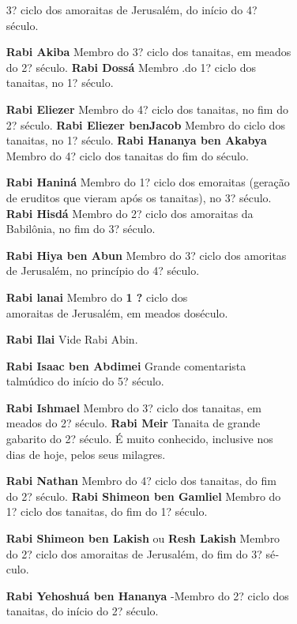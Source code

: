 \begin{itemize}
\begin{enumrate}
\begin{itemize}
\begin{itemize}
\begin{itemize}
\begin{itemize}
\begin{itemize}
3? ciclo dos amoraitas de Jerusalém, do início do 4? século.

\item[\textbf{Rabi Akiba}] Membro do 3? ciclo dos tanaitas, em meados do 2?
século. \textbf{Rabi Dossá} Membro .do 1? ciclo dos tanaitas, no 1?
século.

\item[\textbf{Rabi Eliezer}] Membro do 4? ciclo dos tanaitas, no fim do 2?
século. \textbf{Rabi Eliezer benJacob} Membro do
ciclo dos tanaitas, no 1? século. \textbf{Rabi Hananya ben Akabya}
Mem­bro do 4? ciclo dos tanaitas do fim do
século.

\item[\textbf{Rabi Haniná}] Membro do 1? ciclo dos emoraitas (geração de
eruditos que vieram após os tanaitas), no 3? século. \textbf{Rabi Hisdá} 
Membro do 2? ciclo dos amoraitas da Babilônia, no fim do 3? século.

\item[\textbf{Rabi Hiya ben Abun}] Membro do 3? ciclo dos amoritas de
Jerusalém, no princípio do 4? século.

\item[\textbf{Rabi lanai} Membro do \textbf{1 ?}] ciclo dos\\
amoraitas de Jerusalém, em meados doséculo.

\item[\textbf{Rabi Ilai}] Vide Rabi Abin.

\item[\textbf{Rabi Isaac ben Abdimei}] Grande co­mentarista talmúdico do
início do 5? século.

\item[\textbf{Rabi Ishmael}] Membro do 3? ciclo dos tanaitas, em meados do 2?
século. \textbf{Rabi Meir} Tanaita de grande gabari­to do 2? século. É
muito conhecido, inclusive nos dias de hoje, pelos seus milagres.

\item[\textbf{Rabi Nathan}] Membro do 4? ciclo dos tanaitas, do fim do 2?
século. \textbf{Rabi Shimeon ben Gamliel} Mem­bro do 1? ciclo dos
tanaitas, do fim do 1? século.

\item[\textbf{Rabi Shimeon ben Lakish} ou \textbf{Resh Lakish}] Membro do 2?
ciclo dos amo­raitas de Jerusalém, do fim do 3? sé­culo.

\item[\textbf{Rabi Yehoshuá ben Hananya}] -Membro do 2? ciclo dos tanaitas, do
início do 2? século.


\end{itemize}
\end{itemize}
\end{itemize}
\end{itemize}
\end{itemize}
\end{enumrate}
\end{itemize}
